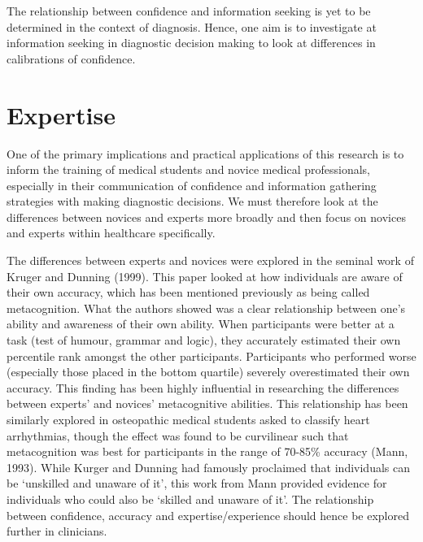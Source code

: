 \documentclass[a4paper, nobind]{templates/ociamthesis}
\begin{document}
The relationship between confidence and information seeking is yet to be determined in the context of diagnosis. Hence, one aim is to investigate at information seeking in diagnostic decision making to look at differences in calibrations of confidence.

\hypertarget{expertise}{%
\section*{Expertise}\label{expertise}}

One of the primary implications and practical applications of this research is to inform the training of medical students and novice medical professionals, especially in their communication of confidence and information gathering strategies with making diagnostic decisions. We must therefore look at the differences between novices and experts more broadly and then focus on novices and experts within healthcare specifically.

The differences between experts and novices were explored in the seminal work of Kruger and Dunning (1999). This paper looked at how individuals are aware of their own accuracy, which has been mentioned previously as being called metacognition. What the authors showed was a clear relationship between one's ability and awareness of their own ability. When participants were better at a task (test of humour, grammar and logic), they accurately estimated their own percentile rank amongst the other participants. Participants who performed worse (especially those placed in the bottom quartile) severely overestimated their own accuracy. This finding has been highly influential in researching the differences between experts' and novices' metacognitive abilities. This relationship has been similarly explored in osteopathic medical students asked to classify heart arrhythmias, though the effect was found to be curvilinear such that metacognition was best for participants in the range of 70-85\% accuracy (Mann, 1993). While Kurger and Dunning had famously proclaimed that individuals can be `unskilled and unaware of it', this work from Mann provided evidence for individuals who could also be `skilled and unaware of it'. The relationship between confidence, accuracy and expertise/experience should hence be explored further in clinicians.
\end{document}
